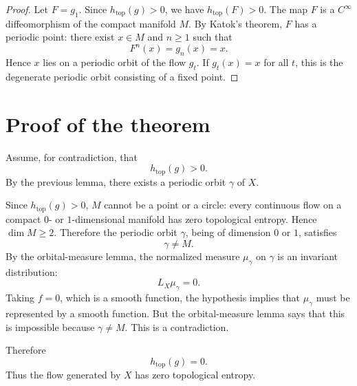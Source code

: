 \documentclass[11pt]{article}
\begin{document}
\begin{proof}
Let \(F=g_1\). Since \(h_{\mathrm{top}}(g)>0\), we have \(h_{\mathrm{top}}(F)>0\). The map \(F\) is a \(C^\infty\) diffeomorphism of the compact manifold \(M\). By Katok's theorem, \(F\) has a periodic point: there exist \(x\in M\) and \(n\ge 1\) such that
\[
F^n(x)=g_n(x)=x.
\]
Hence \(x\) lies on a periodic orbit of the flow \(g_t\). If \(g_t(x)=x\) for all \(t\), this is the degenerate periodic orbit consisting of a fixed point.
\end{proof}

\section{Proof of the theorem}

Assume, for contradiction, that
\[
h_{\mathrm{top}}(g)>0.
\]
By the previous lemma, there exists a periodic orbit \(\gamma\) of \(X\).

Since \(h_{\mathrm{top}}(g)>0\), \(M\) cannot be a point or a circle: every continuous flow on a compact \(0\)- or \(1\)-dimensional manifold has zero topological entropy. Hence \(\dim M\ge 2\). Therefore the periodic orbit \(\gamma\), being of dimension \(0\) or \(1\), satisfies
\[
\gamma\neq M.
\]
By the orbital-measure lemma, the normalized measure \(\mu_\gamma\) on \(\gamma\) is an invariant distribution:
\[
L_X\mu_\gamma=0.
\]
Taking \(f=0\), which is a smooth function, the hypothesis implies that \(\mu_\gamma\) must be represented by a smooth function. But the orbital-measure lemma says that this is impossible because \(\gamma\neq M\). This is a contradiction.

Therefore
\[
h_{\mathrm{top}}(g)=0.
\]
Thus the flow generated by \(X\) has zero topological entropy.
\end{document}
